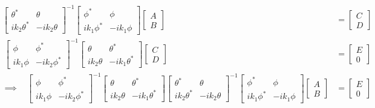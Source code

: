 \documentclass[letter, 10pts]{article}
\begin{document}
\begin{align*}
		\begin{bmatrix} \theta^{*} & \theta \\ 
		i k_2 \theta^{*} & - i k_2 \theta\end{bmatrix}^{-1} 
	\begin{bmatrix} \phi^{*} & \phi \\ 
	i k_1 \phi^{*} & - i k_1 \phi\end{bmatrix} 
		\begin{bmatrix} A \\ B \end{bmatrix} 
				 &=
		\begin{bmatrix} C \\ D \end{bmatrix}  \\ 
\
		\begin{bmatrix} \phi & \phi^{*} \\ i k_1 \phi & - i k_2 \phi^{*}  \end{bmatrix} ^{-1}
	\begin{bmatrix} \theta & \theta ^{*} \\ 
	i k_2 \theta & - i k_1 \theta^{*} \end{bmatrix} 
		\begin{bmatrix} C \\ D \end{bmatrix}  &= 
		\begin{bmatrix} E \\ 0 \end{bmatrix}  \\ 
		\implies 
		\
		\
		\
\
		\begin{bmatrix} \phi & \phi^{*} \\ i k_1 \phi & - i k_2 \phi^{*}  \end{bmatrix} ^{-1}
	\begin{bmatrix} \theta & \theta ^{*} \\ 
	i k_2 \theta & - i k_1 \theta^{*} \end{bmatrix} 
		\begin{bmatrix} \theta^{*} & \theta \\ 
		i k_2 \theta^{*} & - i k_2 \theta\end{bmatrix}^{-1} 
	\begin{bmatrix} \phi^{*} & \phi \\ 
	i k_1 \phi^{*} & - i k_1 \phi\end{bmatrix} 
		\begin{bmatrix} A \\ B \end{bmatrix} 
				 &= 
		\begin{bmatrix} E \\ 0 \end{bmatrix}  \\ 
\end{align*}
\end{document}
